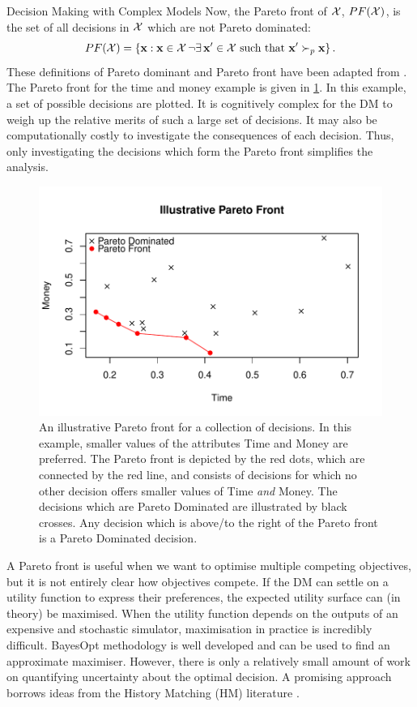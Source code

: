 \begin{chapter}{Decision Making with Complex Models \label{Chap:optimisation}}
Now, the Pareto front of $\cal{X}$, $PF(\mathcal{X})$, is the set of all decisions in $\mathcal{X}$ which are not Pareto dominated:
 \begin{equation*}
 PF(\mathcal{X}) = \left\{ \mathbf{x} : \mathbf{x} \in \mathcal{X} \,\neg \exists\, \mathbf{x}' \in \mathcal{X} \text{ such that } \mathbf{x}' \succ_p \mathbf{x} \right\}.
 \end{equation*}
These definitions of Pareto dominant and Pareto front have been adapted from \citep{Roijers2017}. The Pareto front for the time and money example is given in \cref{Fig:pfront}. In this example, a set of possible decisions are plotted. It is cognitively complex for the DM to weigh up the relative merits of such a large set of decisions. It may also be computationally costly to investigate the consequences of each decision. Thus, only investigating the decisions which form the Pareto front simplifies the analysis.
\begin{figure}
 \centering
 \includegraphics{fig-optim/pfront.pdf}
 \caption{An illustrative Pareto front for a collection of decisions. In this example, smaller values of the attributes Time and Money are preferred. The Pareto front is depicted by the red dots, which are connected by the red line, and consists of decisions for which no other decision offers smaller values of Time \textit{and} Money. The decisions which are Pareto Dominated are illustrated by black crosses. Any decision which is above/to the right of the Pareto front is a Pareto Dominated decision. \label{Fig:pfront}}
\end{figure}

A Pareto front is useful when we want to optimise multiple competing objectives, but it is not entirely clear how objectives compete. If the DM can settle on a utility function to express their preferences, the expected utility surface can (in theory) be maximised. When the utility function depends on the outputs of an expensive and stochastic simulator, maximisation in practice is incredibly difficult. BayesOpt methodology is well developed and can be used to find an approximate maximiser. However, there is only a relatively small amount of work on quantifying uncertainty about the optimal decision. A promising approach borrows ideas from the History Matching (HM) literature \citep{Lawson2016}.


\end{chapter}
